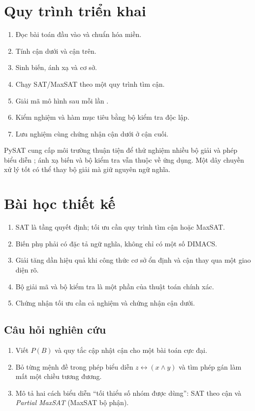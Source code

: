 \section{Quy trình triển khai}

\begin{summarybox}
\begin{enumerate}
  \item Đọc bài toán đầu vào và chuẩn hóa miền.
  \item Tính cận dưới và cận trên.
  \item Sinh biến, ánh xạ và \CNF cơ sở.
  \item Chạy SAT/MaxSAT theo một quy trình tìm cận.
  \item Giải mã mô hình sau mỗi lần \SAT.
  \item Kiểm nghiệm và hàm mục tiêu bằng bộ kiểm tra độc lập.
  \item Lưu nghiệm cùng chứng nhận cận dưới ở cận cuối.
\end{enumerate}
\end{summarybox}

PySAT cung cấp môi trường thuận tiện để thử nghiệm nhiều bộ giải và phép biểu diễn
\parencite{ignatiev2018pysat}; ánh xạ biến và bộ kiểm tra vẫn thuộc về ứng
dụng. Một dây chuyền xử lý tốt có thể thay bộ giải mà giữ nguyên ngữ nghĩa.

\section{Bài học thiết kế}

\begin{enumerate}
  \item SAT là tầng quyết định; tối ưu cần quy trình tìm cận hoặc MaxSAT.
  \item Biến phụ phải có đặc tả ngữ nghĩa, không chỉ có một số DIMACS.
  \item Giải tăng dần hiệu quả khi công thức cơ sở ổn định và cận thay qua
        một giao diện rõ.
  \item Bộ giải mã và bộ kiểm tra là một phần của thuật toán chính xác.
  \item Chứng nhận tối ưu cần cả nghiệm và chứng nhận cận dưới.
\end{enumerate}

\subsection*{Câu hỏi nghiên cứu}
\begin{enumerate}
  \item Viết \(P(B)\) và quy tắc cập nhật cận cho một bài toán cực đại.
  \item Bỏ từng mệnh đề trong phép biểu diễn \(z\leftrightarrow(x\land y)\) và tìm
        phép gán làm mất một chiều tương đương.
  \item Mô tả hai cách biểu diễn ``tối thiểu số nhóm được dùng'': SAT theo cận và
        \emph{Partial MaxSAT} (MaxSAT bộ phận).
\end{enumerate}
